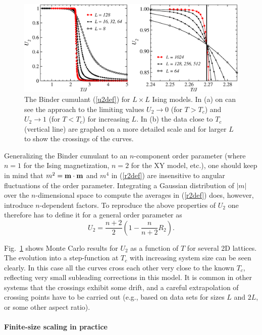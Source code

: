\documentclass[draft,numberedheadings]{aipproc}
\begin{document}
\begin{figure}
\includegraphics[width=12.5cm, clip]{isingbinder.eps}
\caption{The Binder cumulant (\ref{u2def}) for $L\times L$ Ising models. In (a) on can see the approach to the limiting values $U_2\to 0$ 
(for $T>T_c$) and $U_2 \to 1$ (for $T<T_c$) for increasing $L$. In (b) the data close to $T_c$ (vertical line) are graphed on a more detailed 
scale and for larger $L$ to show the crossings of the curves.}
\label{isingbinder}
\end{figure}

Generalizing the Binder cumulant to an $n$-component order parameter (where $n=1$ for the Ising magnetization, $n=2$ for the XY model, etc.), one should keep in 
mind that $m^2= {\bf m} \cdot {\bf m}$ and $m^4$ in (\ref{r2def}) are insensitive to angular fluctuations of the order parameter. Integrating a Gaussian 
distribution of $|m|$ over the $n$-dimensional space to compute the averages in (\ref{r2def}) does, however, introduce $n$-dependent factors. To reproduce 
the above properties of $U_2$ one therefore has to define it for a general order parameter as
\begin{equation}
U_2 = \frac{n+2}{2} \left (1- \frac{n}{n+2}R_2 \right ).
\label{u2defn}
\end{equation}

Fig.~\ref{isingbinder} shows Monte Carlo results for $U_2$ as a function of $T$ for several 2D lattices. The evolution into a step-function 
at $T_c$ with increasing system size can be seen clearly. In this case all the curves cross each other very close to the known $T_c$, reflecting very small
subleading corrections in this model. It is common in other systems that the crossings exhibit some drift, and a careful extrapolation of
crossing points have to be carried out (e.g., based on data sets for sizes $L$ and $2L$, or some other aspect ratio).

\paragraph{Finite-size scaling in practice}
\end{document}
